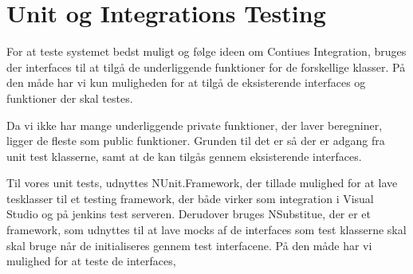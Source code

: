 
\section{Unit og Integrations Testing}
For at teste systemet bedst muligt og følge ideen om Contiues Integration,
 bruges der interfaces til at tilgå de underliggende funktioner for de forskellige klasser.
 På den måde har vi kun muligheden for at tilgå de eksisterende interfaces og funktioner der skal testes. 
 
 Da vi ikke har mange underliggende private funktioner, der laver beregniner, ligger de fleste som public funktioner.
 Grunden til det er så der er adgang fra unit test klasserne, samt at de kan tilgås gennem eksisterende interfaces.

 Til vores unit tests, udnyttes NUnit.Framework, der tillade mulighed for at lave tesklasser til et testing framework, der både virker som integration i Visual Studio og på jenkins test serveren.
 Derudover bruges NSubstitue, der er et framework, som udnyttes til at lave mocks af de interfaces som test klasserne skal skal bruge når de initialiseres gennem test interfacene.
 På den måde har vi mulighed for at teste de interfaces, 